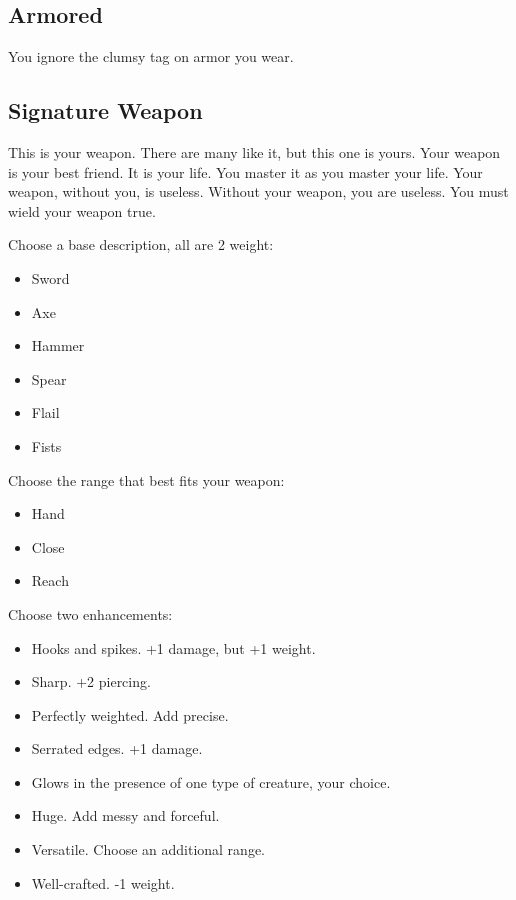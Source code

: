 \subsection{Armored}

You ignore the clumsy tag on armor you wear.
\subsection{Signature Weapon}

This is your weapon. There are many like it, but this one is yours. Your weapon is your best friend. It is your life. You master it as you master your life. Your weapon, without you, is useless. Without your weapon, you are useless. You must wield your weapon true.

Choose a base description, all are 2 weight:
\begin{itemize}
\item Sword
\item Axe
\item Hammer
\item Spear
\item Flail
\item Fists

\end{itemize}

Choose the range that best fits your weapon:
\begin{itemize}
\item Hand
\item Close
\item Reach

\end{itemize}

Choose two enhancements:
\begin{itemize}
\item Hooks and spikes. +1 damage, but +1 weight.
\item Sharp. +2 piercing.
\item Perfectly weighted. Add precise.
\item Serrated edges. +1 damage.
\item Glows in the presence of one type of creature, your choice.
\item Huge. Add messy and forceful.
\item Versatile. Choose an additional range.
\item Well-crafted. -1 weight.

\end{itemize}

